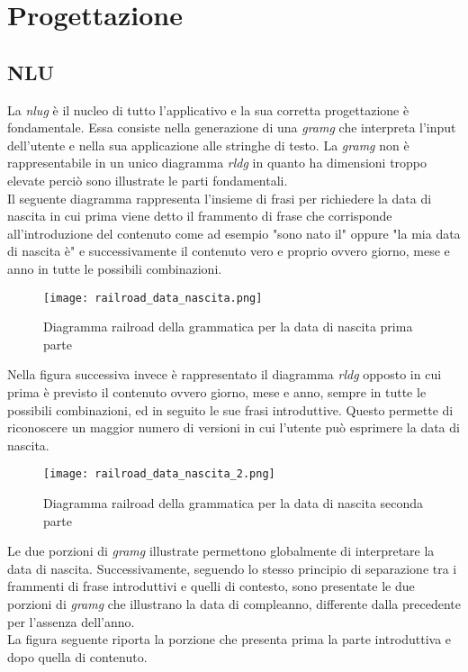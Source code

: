 \section{Progettazione}
	\subsection{NLU}
	La \emph{\gls{nlug}} è il nucleo di tutto l'applicativo e la sua corretta progettazione è fondamentale. Essa consiste nella generazione di una \emph{\gls{gramg}} che interpreta l'input dell'utente e nella sua applicazione alle stringhe di testo. La \emph{\gls{gramg}} non è rappresentabile in un unico diagramma \emph{\gls{rldg}} in quanto ha dimensioni troppo elevate perciò sono illustrate le parti fondamentali. \\
	Il seguente diagramma rappresenta l'insieme di frasi per richiedere la data di nascita in cui prima viene detto il frammento di frase che corrisponde all'introduzione del contenuto come ad esempio "sono nato il" oppure "la mia data di nascita è" e successivamente il contenuto vero e proprio ovvero giorno, mese e anno in tutte le possibili combinazioni. 
		
	\begin{figure}[htbp]
		\begin{center}
			\texttt{[image: railroad\_data\_nascita.png]}
			\caption{Diagramma railroad della grammatica per la data di nascita prima parte}
		\end{center}
	\end{figure}

	\pagebreak
	
	Nella figura successiva invece è rappresentato il diagramma \emph{\gls{rldg}} opposto in cui prima è previsto il contenuto ovvero giorno, mese e anno, sempre in tutte le possibili combinazioni, ed in seguito le sue frasi introduttive. Questo permette di riconoscere un maggior numero di versioni in cui l'utente può esprimere la data di nascita.
	
	\begin{figure}[htbp]
		\begin{center}
			\texttt{[image: railroad\_data\_nascita\_2.png]}
			\caption{Diagramma railroad della grammatica per la data di nascita seconda parte}
		\end{center}
	\end{figure}

	Le due porzioni di \emph{\gls{gramg}} illustrate permettono globalmente di interpretare la data di nascita. Successivamente, seguendo lo stesso principio di separazione tra i frammenti di frase introduttivi e quelli di contesto, sono presentate le due porzioni di \emph{\gls{gramg}} che illustrano la data di compleanno, differente dalla precedente per l'assenza dell'anno. \\
	La figura seguente riporta la porzione che presenta prima la parte introduttiva e dopo quella di contenuto.
	
